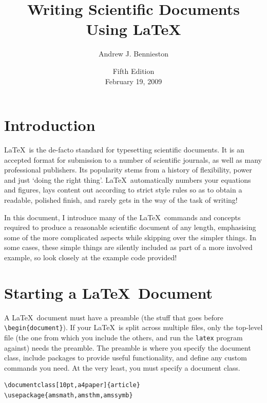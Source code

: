\documentclass[pdftex,a4paper,10pt]{article}
\title{Writing Scientific Documents Using \LaTeX}
\author{Andrew J. Bennieston}
\date{Fifth Edition\\
February 19, 2009}
\begin{document}
\maketitle
\tableofcontents

\section{Introduction}
\LaTeX\, is the de-facto standard for typesetting scientific documents. It is an accepted format for submission to a number of scientific journals, as well as many professional publishers. Its popularity stems from a history of flexibility, power and just `doing the right thing'. \LaTeX\, automatically numbers your equations and figures, lays content out according to strict style rules so as to obtain a readable, polished finish, and rarely gets in the way of the task of writing!

In this document, I introduce many of the \LaTeX\, commands and concepts required to produce a reasonable scientific document of any length, emphasising some of the more complicated aspects while skipping over the simpler things. In some cases, these simple things are silently included as part of a more involved example, so look closely at the example code provided!

\section{Starting a \LaTeX\, Document}
A \LaTeX\, document must have a preamble (the stuff that goes before \\
\verb|\begin{document}|). If your \LaTeX\, is split across multiple files, only the top-level file (the one from which you include the others, and run the \verb|latex| program against) needs the preamble. The preamble is where you specify the document class, include packages to provide useful functionality, and define any custom commands you need. At the very least, you must specify a document class.
\begin{verbatim}
\documentclass[10pt,a4paper]{article}
\usepackage{amsmath,amsthm,amssymb}
\end{verbatim}
\end{document}
